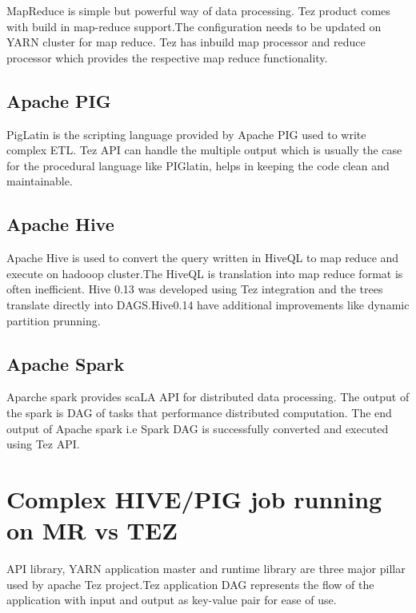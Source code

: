 \documentclass[9pt,twocolumn,twoside]{../../styles/osajnl}
\begin{document}
    MapReduce is simple but powerful way of data processing. Tez product comes with
    build in map-reduce support.The configuration needs to be updated on YARN cluster
    for map reduce. Tez has inbuild map processor and reduce processor which provides the
    respective map reduce functionality.
               
 \subsection{Apache PIG}              
              
   PigLatin is the scripting language provided by Apache PIG used to write complex ETL.
   Tez API can handle the multiple output which is usually the case for the procedural language like PIGlatin, helps in keeping the code clean and maintainable.
 
  \subsection{Apache Hive}
              
   Apache Hive is used to convert the query written in HiveQL to map reduce and execute on hadooop cluster.The HiveQL is translation into map reduce format is often inefficient. Hive 0.13 was developed using Tez integration \cite{www-hive1} and the trees translate directly into DAGS.Hive0.14 have additional improvements like dynamic partition prunning. 
               
 \subsection{Apache Spark}
         
  Aparche spark provides scaLA API for distributed data processing. The output of the spark is DAG of tasks that performance distributed computation. The end output of Apache spark i.e Spark DAG is successfully converted and executed using Tez API.


 \section{Complex HIVE/PIG job running on MR vs TEZ}


 API library, YARN application master and runtime library are three major pillar used 
 by apache Tez project.Tez application DAG represents the flow of the application with input and 
 output as key-value pair for ease of use.
\end{document}
